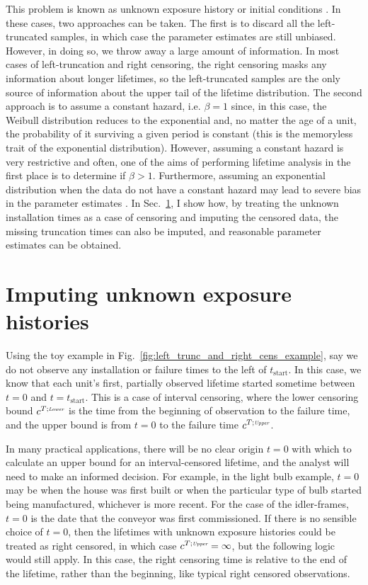 This problem is known as unknown exposure history or initial conditions \citep{guo1993}. In these cases, two approaches can be taken. The first is to discard all the left-truncated samples, in which case the parameter estimates are still unbiased. However, in doing so, we throw away a large amount of information. In most cases of left-truncation and right censoring, the right censoring masks any information about longer lifetimes, so the left-truncated samples are the only source of information about the upper tail of the lifetime distribution. The second approach is to assume a constant hazard, i.e. $\beta = 1$ since, in this case, the Weibull distribution reduces to the exponential and, no matter the age of a unit, the probability of it surviving a given period is constant (this is the memoryless trait of the exponential distribution). However, assuming a constant hazard is very restrictive and often, one of the aims of performing lifetime analysis in the first place is to determine if $\beta > 1$. Furthermore, assuming an exponential distribution when the data do not have a constant hazard may lead to severe bias in the parameter estimates \citep{heckman1986}. In Sec.~\ref{sec:lt-imputation}, I show how, by treating the unknown installation times as a case of censoring and imputing the censored data, the missing truncation times can also be imputed, and reasonable parameter estimates can be obtained.

\section{Imputing unknown exposure histories} \label{sec:lt-imputation}

Using the toy example in Fig.~\ref{fig:left_trunc_and_right_cens_example}, say we do not observe any installation or failure times to the left of $t_\text{start}$. In this case, we know that each unit's first, partially observed lifetime started sometime between $t = 0$ and $t = t_\text{start}$. This is a case of interval censoring, where the lower censoring bound $c^{T;\textit{\tiny{Lower}}}$ is the time from the beginning of observation to the failure time, and the upper bound is from $t = 0$ to the failure time $c^{T;\textit{\tiny{Upper}}}$.

In many practical applications, there will be no clear origin $t = 0$ with which to calculate an upper bound for an interval-censored lifetime, and the analyst will need to make an informed decision. For example, in the light bulb example, $t = 0$ may be when the house was first built or when the particular type of bulb started being manufactured, whichever is more recent. For the case of the idler-frames, $t = 0$ is the date that the conveyor was first commissioned. If there is no sensible choice of $t = 0$, then the lifetimes with unknown exposure histories could be treated as right censored, in which case $c^{T;\textit{\tiny{Upper}}} = \infty$, but the following logic would still apply. In this case, the right censoring time is relative to the end of the lifetime, rather than the beginning, like typical right censored observations.

